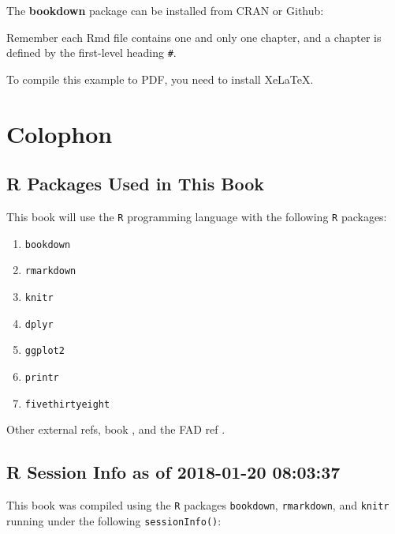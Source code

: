 \documentclass[]{book}
\providecommand{\tightlist}{%
  \setlength{\itemsep}{0pt}\setlength{\parskip}{0pt}}
\theoremstyle{definition}
\theoremstyle{definition}
\theoremstyle{definition}
\theoremstyle{remark}
\begin{document}
The \textbf{bookdown} package can be installed from CRAN or Github:

Remember each Rmd file contains one and only one chapter, and a chapter
is defined by the first-level heading \texttt{\#}.

To compile this example to PDF, you need to install XeLaTeX.

\section*{Colophon}\label{colophon}

\subsection*{R Packages Used in This
Book}\label{r-packages-used-in-this-book}

This book will use the \texttt{R} programming language \citep{R-base}
with the following \texttt{R} packages:

\begin{enumerate}
\def\labelenumi{\arabic{enumi}.}
\tightlist
\item
  \texttt{bookdown} \citep{R-bookdown}
\item
  \texttt{rmarkdown} \citep{R-rmarkdown}
\item
  \texttt{knitr} \citep{R-knitr}
\item
  \texttt{dplyr} \citep{R-dplyr}
\item
  \texttt{ggplot2} \citep{R-ggplot2}
\item
  \texttt{printr} \citep{R-printr}
\item
  \texttt{fivethirtyeight} \citep{R-fivethirtyeight}
\end{enumerate}

Other external refs, book \citep{xie2015}, and the FAD ref
\citep{Miller_Epstein_Bishop_Keitner_1985}.

\subsection*{R Session Info as of 2018-01-20
08:03:37}\label{r-session-info-as-of-2018-01-20-080337}

This book was compiled using the \texttt{R} packages \texttt{bookdown},
\texttt{rmarkdown}, and \texttt{knitr} running under the following
\texttt{sessionInfo()}:
\end{document}
